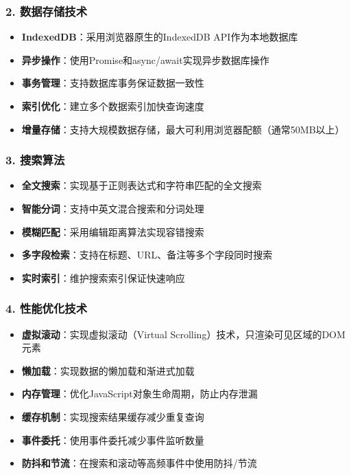 \documentclass[10pt,a4paper]{article}
\begin{document}
\subsubsection*{2. 数据存储技术}
\begin{itemize}
  \item \textbf{IndexedDB}：采用浏览器原生的IndexedDB API作为本地数据库
  \item \textbf{异步操作}：使用Promise和async/await实现异步数据库操作
  \item \textbf{事务管理}：支持数据库事务保证数据一致性
  \item \textbf{索引优化}：建立多个数据索引加快查询速度
  \item \textbf{增量存储}：支持大规模数据存储，最大可利用浏览器配额（通常50MB以上）
\end{itemize}

\subsubsection*{3. 搜索算法}
\begin{itemize}
  \item \textbf{全文搜索}：实现基于正则表达式和字符串匹配的全文搜索
  \item \textbf{智能分词}：支持中英文混合搜索和分词处理
  \item \textbf{模糊匹配}：采用编辑距离算法实现容错搜索
  \item \textbf{多字段检索}：支持在标题、URL、备注等多个字段同时搜索
  \item \textbf{实时索引}：维护搜索索引保证快速响应
\end{itemize}

\subsubsection*{4. 性能优化技术}
\begin{itemize}
  \item \textbf{虚拟滚动}：实现虚拟滚动（Virtual Scrolling）技术，只渲染可见区域的DOM元素
  \item \textbf{懒加载}：实现数据的懒加载和渐进式加载
  \item \textbf{内存管理}：优化JavaScript对象生命周期，防止内存泄漏
  \item \textbf{缓存机制}：实现搜索结果缓存减少重复查询
  \item \textbf{事件委托}：使用事件委托减少事件监听数量
  \item \textbf{防抖和节流}：在搜索和滚动等高频事件中使用防抖/节流
\end{itemize}
\end{document}
